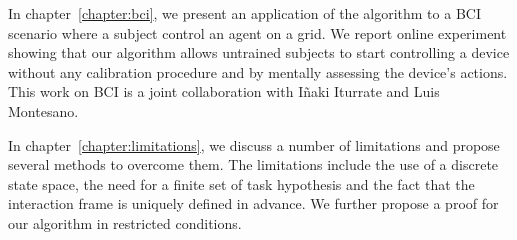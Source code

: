 In chapter~\ref{chapter:bci}, we present an application of the algorithm to a BCI scenario where a subject control an agent on a grid. We report online experiment showing that our algorithm allows untrained subjects to start controlling a device without any calibration procedure and by mentally assessing the device's actions. This work on BCI is a joint collaboration with I{\~n}aki Iturrate and Luis Montesano.

In chapter~\ref{chapter:limitations}, we discuss a number of limitations and propose several methods to overcome them. The limitations include the use of a discrete state space, the need for a finite set of task hypothesis and the fact that the interaction frame is uniquely defined in advance. We further propose a proof for our algorithm in restricted conditions.